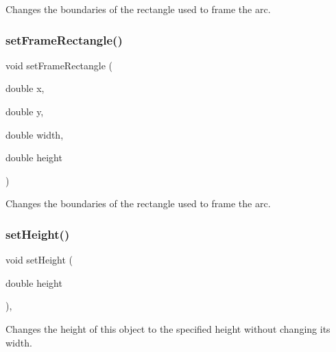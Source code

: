Changes the boundaries of the rectangle used to frame the arc. 

\mbox{\label{classsgl_1_1GArc_a9532c0e65946d2f533f3c9abf8150a1d}} 
\subsubsection{\texorpdfstring{set\+Frame\+Rectangle()}{setFrameRectangle()}\hspace{0.1cm}{\footnotesize\ttfamily [2/2]}}
{\footnotesize\ttfamily void set\+Frame\+Rectangle (\begin{DoxyParamCaption}\item[{double}]{x,  }\item[{double}]{y,  }\item[{double}]{width,  }\item[{double}]{height }\end{DoxyParamCaption})\hspace{0.3cm}{\ttfamily [virtual]}}



Changes the boundaries of the rectangle used to frame the arc. 

\mbox{\label{classsgl_1_1GObject_a9e280bfc4544dfaf8e4376c4e1a74357}} 
\subsubsection{\texorpdfstring{set\+Height()}{setHeight()}}
{\footnotesize\ttfamily void set\+Height (\begin{DoxyParamCaption}\item[{double}]{height }\end{DoxyParamCaption})\hspace{0.3cm}{\ttfamily [virtual]}, {\ttfamily [inherited]}}



Changes the height of this object to the specified height without changing its width. 

\mbox{\label{classsgl_1_1GObject_add11575087eb94f1a71faa3f826c6341}} 
